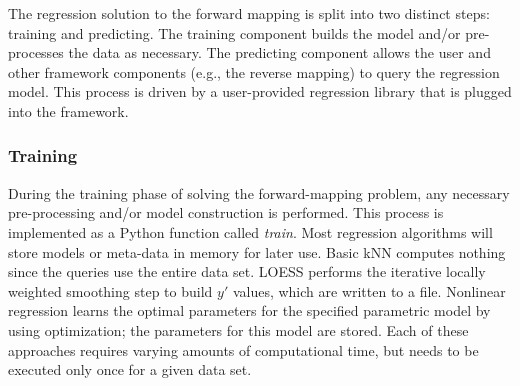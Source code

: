The \fw regression solution to the forward mapping is split into two distinct steps: training and predicting.
The training component builds the model and/or pre-processes the data as necessary.
The predicting component allows the user and other framework components (e.g., the reverse mapping) to query the regression model.
This process is driven by a user-provided regression library that is plugged into the framework.

\subsubsection{Training}

During the training phase of solving the forward-mapping problem, any necessary pre-processing and/or model construction is performed.
This process is implemented as a Python function called \textit{train}.
Most regression algorithms will store models or meta-data in memory for later use.
Basic kNN computes nothing since the queries use the entire data set.
LOESS performs the iterative locally weighted smoothing step to build $y'$ values, which are
written to a file.
Nonlinear regression learns the optimal parameters for the specified parametric model by using optimization; the parameters for this model are stored.
Each of these approaches requires varying amounts of computational time, but needs to be executed only once for a given data set.


